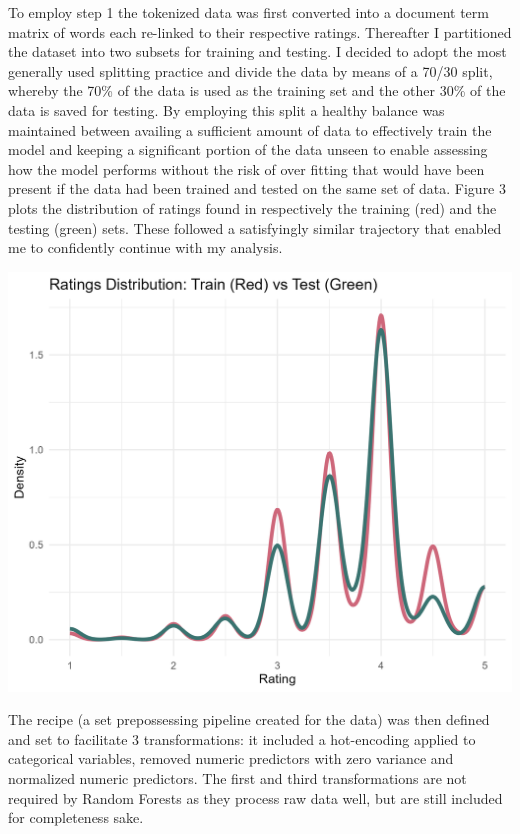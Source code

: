 \documentclass[11pt,preprint]{elsarticle}
\let\origfigure\figure
\let\endorigfigure\endfigure
\renewenvironment{figure}[1][2] {
    \expandafter\origfigure\expandafter[H]
} {
    \endorigfigure
}
\numberwithin{equation}{section}
\numberwithin{figure}{section}
\numberwithin{table}{section}
\begin{document}
To employ step 1 the tokenized data was first converted into a document
term matrix of words each re-linked to their respective ratings.
Thereafter I partitioned the dataset into two subsets for training and
testing. I decided to adopt the most generally used splitting practice
and divide the data by means of a 70/30 split, whereby the 70\% of the
data is used as the training set and the other 30\% of the data is saved
for testing. By employing this split a healthy balance was maintained
between availing a sufficient amount of data to effectively train the
model and keeping a significant portion of the data unseen to enable
assessing how the model performs without the risk of over fitting that
would have been present if the data had been trained and tested on the
same set of data. Figure 3 plots the distribution of ratings found in
respectively the training (red) and the testing (green) sets. These
followed a satisfyingly similar trajectory that enabled me to
confidently continue with my analysis.

\begin{figure}[H]

{\centering \includegraphics[width=0.8\linewidth]{writeup/fig3} 

}

\caption{Distribution of training and testing data}\label{fig:fig3}
\end{figure}

The recipe (a set prepossessing pipeline created for the data) was then
defined and set to facilitate 3 transformations: it included a
hot-encoding applied to categorical variables, removed numeric
predictors with zero variance and normalized numeric predictors. The
first and third transformations are not required by Random Forests as
they process raw data well, but are still included for completeness
sake.
\end{document}
